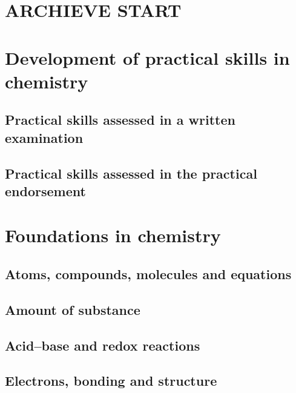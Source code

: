 \newcommand{\getpart}[1]{}
\newcommand{\getchap}[1]{\chapter{ERROR: getchap should be redifined}}

% 
% 
% 
% 
% 
% 

\getpart{practical}
\getpart{foundation}
\getpart{table}
\getpart{organic_core}
\getpart{physical}
\getpart{organic_analysis}


\part{ARCHIEVE START} %
\part{Development of practical skills in chemistry} \label{ocr:mod:1}
\chapter{Practical skills assessed in a written examination}
\chapter{Practical skills assessed in the practical endorsement}

\part{Foundations in chemistry}
\chapter{Atoms, compounds, molecules and equations}
\chapter{Amount of substance}
\chapter{Acid–base and redox reactions}
\chapter{Electrons, bonding and structure}


